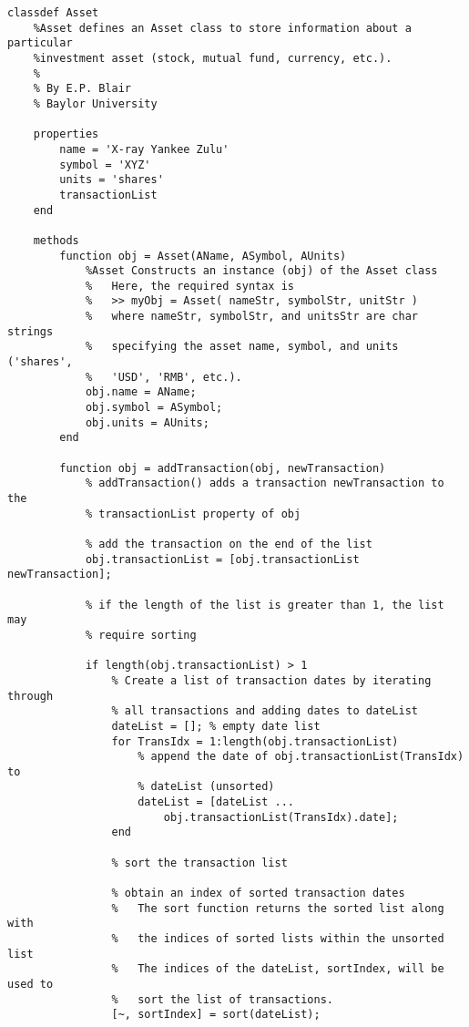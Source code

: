 \begin{lstlisting}[style=Matlab-editor, caption={The \texttt{Asset} class with a new \texttt{calculateValue()} method.}, label={lst:AssetValueCalculation}]
classdef Asset
    %Asset defines an Asset class to store information about a particular
    %investment asset (stock, mutual fund, currency, etc.).
    %
    % By E.P. Blair
    % Baylor University
    
    properties
        name = 'X-ray Yankee Zulu'
        symbol = 'XYZ'
        units = 'shares'
        transactionList
    end
    
    methods
        function obj = Asset(AName, ASymbol, AUnits)
            %Asset Constructs an instance (obj) of the Asset class
            %   Here, the required syntax is
            %   >> myObj = Asset( nameStr, symbolStr, unitStr )
            %   where nameStr, symbolStr, and unitsStr are char strings
            %   specifying the asset name, symbol, and units ('shares',
            %   'USD', 'RMB', etc.).
            obj.name = AName;
            obj.symbol = ASymbol;
            obj.units = AUnits;
        end
        
        function obj = addTransaction(obj, newTransaction)
            % addTransaction() adds a transaction newTransaction to the
            % transactionList property of obj
            
            % add the transaction on the end of the list
            obj.transactionList = [obj.transactionList newTransaction];
            
            % if the length of the list is greater than 1, the list may
            % require sorting
            
            if length(obj.transactionList) > 1
                % Create a list of transaction dates by iterating through
                % all transactions and adding dates to dateList
                dateList = []; % empty date list
                for TransIdx = 1:length(obj.transactionList)
                    % append the date of obj.transactionList(TransIdx) to
                    % dateList (unsorted)
                    dateList = [dateList ...
                        obj.transactionList(TransIdx).date];
                end
                
                % sort the transaction list
                
                % obtain an index of sorted transaction dates
                %   The sort function returns the sorted list along with
                %   the indices of sorted lists within the unsorted list
                %   The indices of the dateList, sortIndex, will be used to
                %   sort the list of transactions.
                [~, sortIndex] = sort(dateList);
                

\end{lstlisting}
